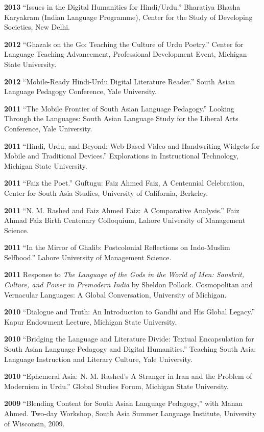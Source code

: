 \documentclass[letterpaper,12pt]{article}
\begin{document}
\textbf{2013}
“Issues in the Digital Humanities for Hindi/Urdu.”
Bharatiya Bhasha Karyakram (Indian Language Programme),
Center for the Study of Developing Societies, New Delhi.

\textbf{2012}
“Ghazals on the Go: Teaching the Culture of Urdu Poetry.”
Center for Language Teaching Advancement,
Professional Development Event,
Michigan State University.

\textbf{2012}
“Mobile-Ready Hindi-Urdu Digital Literature Reader.”
South Asian Language Pedagogy Conference, Yale University.

\textbf{2011}
“The Mobile Frontier of South Asian Language Pedagogy.”
Looking Through the Languages:
South Asian Language Study for the Liberal Arts Conference,
Yale University.

\textbf{2011}
“Hindi, Urdu, and Beyond:
Web-Based Video and Handwriting Widgets for Mobile and Traditional Devices.”
Explorations in Instructional Technology, Michigan State University.

\textbf{2011}
“Faiz the Poet.”
Guftugu: Faiz Ahmed Faiz, A Centennial Celebration,
Center for South Asia Studies, University of California, Berkeley.

\textbf{2011}
“N. M. Rashed and Faiz Ahmed Faiz: A Comparative Analysis.”
Faiz Ahmad Faiz Birth Centenary Colloquium,
Lahore University of Management Science.

\textbf{2011}
“In the Mirror of Ghalib: Postcolonial Reflections on Indo-Muslim Selfhood.”
Lahore University of Management Science.

\textbf{2011}
Response to \emph{The Language of the Gods in the World of Men:
Sanskrit, Culture, and Power in Premodern India} by Sheldon Pollock.
Cosmopolitan and Vernacular Languages: A Global Conversation, University of Michigan.

\textbf{2010}
“Dialogue and Truth: An Introduction to Gandhi and His Global Legacy.”
Kapur Endowment Lecture, Michigan State University.

\textbf{2010}
“Bridging the Language and Literature Divide:
Textual Encapsulation for South Asian Language Pedagogy and Digital Humanities.”
Teaching South Asia: Language Instruction and Literary Culture, Yale University.

\textbf{2010}
“Ephemeral Asia:
N. M. Rashed’s A Stranger in Iran and the Problem of Modernism in Urdu.”
Global Studies Forum, Michigan State University.

\textbf{2009}
“Blending Content for South Asian Language Pedagogy,”
with Manan Ahmed.
Two-day Workshop, South Asia Summer Language Institute,
University of Wisconsin, 2009.
\end{document}

